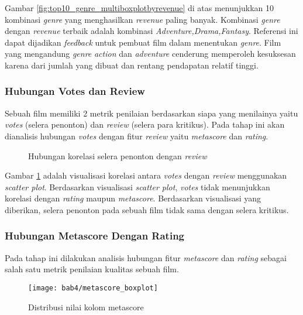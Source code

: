 Gambar \ref{fig:top10_genre_multiboxplotbyrevenue} di atas menunjukkan 10 kombinasi \textit{genre} yang menghasilkan \textit{revenue} paling banyak. Kombinasi \textit{genre} dengan \textit{revenue} terbaik adalah kombinasi \textit{Adventure,Drama,Fantasy}. Referensi ini dapat dijadikan \textit{feedback} untuk pembuat film dalam menentukan \textit{genre}. Film yang mengandung \textit{genre} \textit{action} dan \textit{adventure} cenderung memperoleh kesuksesan karena dari jumlah yang dibuat dan rentang pendapatan relatif tinggi.

\subsubsection{Hubungan Votes dan Review}
Sebuah film memiliki 2 metrik penilaian berdasarkan siapa yang menilainya yaitu \textit{votes} (selera penonton) dan \textit{review} (selera para kritikus). Pada tahap ini akan dianalisis hubungan \textit{votes} dengan fitur \textit{review} yaitu \textit{metascore} dan \textit{rating}. 

\begin{figure}[H]
    \centering
    \qquad
    \caption{Hubungan korelasi selera penonton dengan \textit{review}}%
    \label{fig:votes_rating_metascore_scatterplot}%
\end{figure}

Gambar \ref{fig:votes_rating_metascore_scatterplot} adalah visualisasi korelasi antara \textit{votes} dengan \textit{review} menggunakan \textit{scatter plot}. Berdasarkan visualisasi \textit{scatter plot}, \textit{votes} tidak menunjukkan korelasi dengan \textit{rating} maupun \textit{metascore}. Berdasarkan visualisasi yang diberikan, selera penonton pada sebuah film tidak sama dengan selera kritikus.

\subsubsection{Hubungan Metascore Dengan Rating}
Pada tahap ini dilakukan analisis hubungan fitur \textit{metascore} dan \textit{rating} sebagai salah satu metrik penilaian kualitas sebuah film. 

\begin{figure}[H]
	\centering  
	\texttt{[image: bab4/metascore\_boxplot]}   
	\caption{Distribusi nilai kolom metascore}
	\label{fig:metascore_boxplot} 
\end{figure} 

